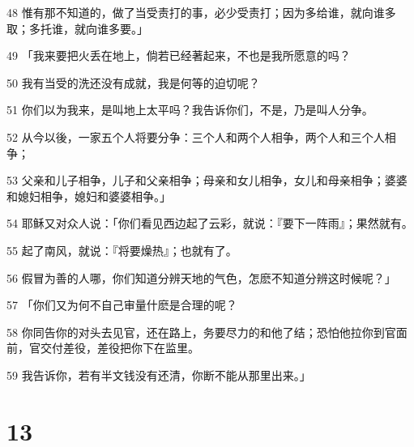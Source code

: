 \par 48 惟有那不知道的，做了当受责打的事，必少受责打；因为多给谁，就向谁多取；多托谁，就向谁多要。」
\par 49 「我来要把火丢在地上，倘若已经著起来，不也是我所愿意的吗？
\par 50 我有当受的洗还没有成就，我是何等的迫切呢？
\par 51 你们以为我来，是叫地上太平吗？我告诉你们，不是，乃是叫人分争。
\par 52 从今以後，一家五个人将要分争：三个人和两个人相争，两个人和三个人相争；
\par 53 父亲和儿子相争，儿子和父亲相争；母亲和女儿相争，女儿和母亲相争；婆婆和媳妇相争，媳妇和婆婆相争。」
\par 54 耶稣又对众人说：「你们看见西边起了云彩，就说：『要下一阵雨』；果然就有。
\par 55 起了南风，就说：『将要燥热』；也就有了。
\par 56 假冒为善的人哪，你们知道分辨天地的气色，怎麽不知道分辨这时候呢？」
\par 57 「你们又为何不自己审量什麽是合理的呢？
\par 58 你同告你的对头去见官，还在路上，务要尽力的和他了结；恐怕他拉你到官面前，官交付差役，差役把你下在监里。
\par 59 我告诉你，若有半文钱没有还清，你断不能从那里出来。」

\chapter{13}

